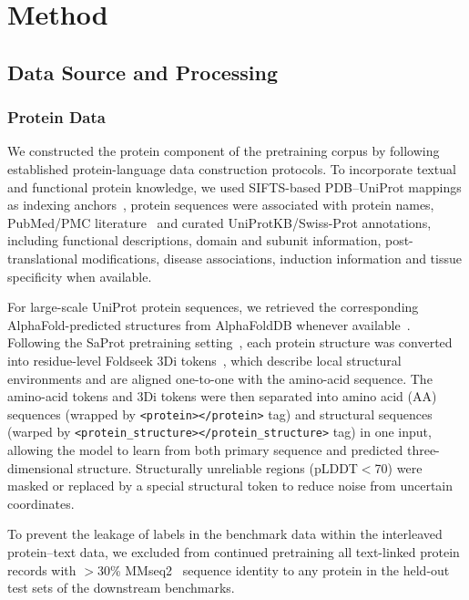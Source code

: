 
\section{Method}\label{sec13}
\subsection{Data Source and Processing}
\subsubsection{Protein Data}

We constructed the protein component of the pretraining corpus by following established protein-language data construction protocols. 
To incorporate textual and functional protein knowledge, we used SIFTS-based PDB--UniProt mappings as indexing anchors~\citep{dana2019sifts,berman2000pdb,uniprot2023uniprot}, protein sequences were associated with protein names, PubMed/PMC literature~\citep{pubmed,pubmed_central} and curated UniProtKB/Swiss-Prot annotations, including functional descriptions, domain and subunit information, post-translational modifications, disease associations, induction information and tissue specificity when available. 

For large-scale UniProt protein sequences, we retrieved the corresponding AlphaFold-predicted structures from AlphaFoldDB whenever available~\citep{varadi2022alphafold}. Following the SaProt pretraining setting~\citep{su2025saprothub,su2024saprot}, each protein structure was converted into residue-level Foldseek 3Di tokens~\citep{van2024fast}, which describe local structural environments and are aligned one-to-one with the amino-acid sequence. The amino-acid tokens and 3Di tokens were then separated into amino acid (AA) sequences (wrapped by \verb|<protein></protein>| tag) and structural sequences (warped by \verb|<protein_structure></protein_structure>| tag) in one input, allowing the model to learn from both primary sequence and predicted three-dimensional structure. Structurally unreliable regions (pLDDT$<$70) were masked or replaced by a special structural token to reduce noise from uncertain coordinates. 

To prevent the leakage of labels in the benchmark data within the interleaved protein--text data, we excluded from continued pretraining all text-linked protein records with $>$30\% MMseq2~\citep{steinegger2017mmseqs2,kshirsagar2025rapid} sequence identity to any protein in the held-out test sets of the downstream benchmarks.

